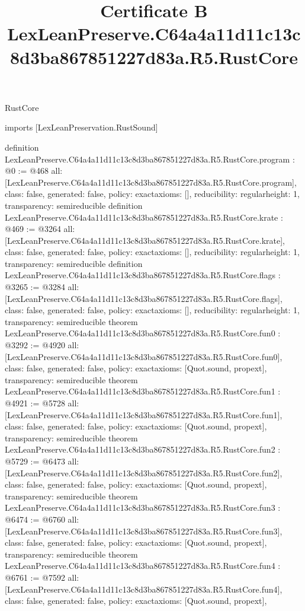 \begin{lexlean}{RustCore}
\title{Certificate B LexLeanPreserve.C64a4a11d11c13c8d3ba867851227d83a.R5.RustCore}
\begin{coremodule}
imports [LexLeanPreservation.RustSound]

definition LexLeanPreserve.C64a4a11d11c13c8d3ba867851227d83a.R5.RustCore.program : @0 := @468 {
  all: [LexLeanPreserve.C64a4a11d11c13c8d3ba867851227d83a.R5.RustCore.program],
  class: false,
  generated: false,
  policy: exact{axioms: []},
  reducibility: regular{height: 1},
  transparency: semireducible
}
definition LexLeanPreserve.C64a4a11d11c13c8d3ba867851227d83a.R5.RustCore.krate : @469 := @3264 {
  all: [LexLeanPreserve.C64a4a11d11c13c8d3ba867851227d83a.R5.RustCore.krate],
  class: false,
  generated: false,
  policy: exact{axioms: []},
  reducibility: regular{height: 1},
  transparency: semireducible
}
definition LexLeanPreserve.C64a4a11d11c13c8d3ba867851227d83a.R5.RustCore.flags : @3265 := @3284 {
  all: [LexLeanPreserve.C64a4a11d11c13c8d3ba867851227d83a.R5.RustCore.flags],
  class: false,
  generated: false,
  policy: exact{axioms: []},
  reducibility: regular{height: 1},
  transparency: semireducible
}
theorem LexLeanPreserve.C64a4a11d11c13c8d3ba867851227d83a.R5.RustCore.fun0 : @3292 := @4920 {
  all: [LexLeanPreserve.C64a4a11d11c13c8d3ba867851227d83a.R5.RustCore.fun0],
  class: false,
  generated: false,
  policy: exact{axioms: [Quot.sound, propext]},
  transparency: semireducible
}
theorem LexLeanPreserve.C64a4a11d11c13c8d3ba867851227d83a.R5.RustCore.fun1 : @4921 := @5728 {
  all: [LexLeanPreserve.C64a4a11d11c13c8d3ba867851227d83a.R5.RustCore.fun1],
  class: false,
  generated: false,
  policy: exact{axioms: [Quot.sound, propext]},
  transparency: semireducible
}
theorem LexLeanPreserve.C64a4a11d11c13c8d3ba867851227d83a.R5.RustCore.fun2 : @5729 := @6473 {
  all: [LexLeanPreserve.C64a4a11d11c13c8d3ba867851227d83a.R5.RustCore.fun2],
  class: false,
  generated: false,
  policy: exact{axioms: [Quot.sound, propext]},
  transparency: semireducible
}
theorem LexLeanPreserve.C64a4a11d11c13c8d3ba867851227d83a.R5.RustCore.fun3 : @6474 := @6760 {
  all: [LexLeanPreserve.C64a4a11d11c13c8d3ba867851227d83a.R5.RustCore.fun3],
  class: false,
  generated: false,
  policy: exact{axioms: [Quot.sound, propext]},
  transparency: semireducible
}
theorem LexLeanPreserve.C64a4a11d11c13c8d3ba867851227d83a.R5.RustCore.fun4 : @6761 := @7592 {
  all: [LexLeanPreserve.C64a4a11d11c13c8d3ba867851227d83a.R5.RustCore.fun4],
  class: false,
  generated: false,
  policy: exact{axioms: [Quot.sound, propext]},
}
\end{coremodule}
\end{lexlean}
